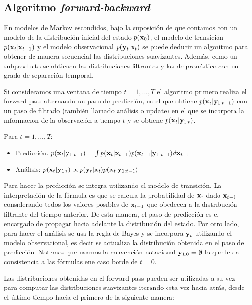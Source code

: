 \subsection{Algoritmo \textit{forward-backward}}

En modelos de Markov escondidos, bajo la suposición de que contamos con un modelo de la distribución inicial del estado $p(\mathbf{x}_0)$, el modelo de transición $p(\mathbf{x}_t | \mathbf{x}_{t-1})$ y el modelo observacional $p(\mathbf{y}_t | \mathbf{x}_t)$ se puede deducir un algoritmo para obtener de manera secuencial las distribuciones suavizantes. Además, como un subproducto se obtienen las distribuciones filtrantes y las de pronóstico con un grado de separación temporal. 

Si consideramos una ventana de tiempo $t = 1, ..., T$ el algoritmo primero realiza el forward-pass alternando un paso de predicción, en el que obtiene $p(\mathbf{x}_t | \mathbf{y}_{1:t-1})$ con un paso de filtrado (también llamado análisis o update) en el que se incorpora la información de la observación a tiempo $t$ y se obtiene $p(\mathbf{x}_t | \mathbf{y}_{1:t})$. 

Para $t = 1, ..., T$:
\begin{itemize}
    \item Predicción: $p(\mathbf{x}_t | \mathbf{y}_{1:t-1}) = \int p(\mathbf{x}_t | \mathbf{x}_{t-1}) p(\mathbf{x}_{t-1} | \mathbf{y}_{1:t-1}) d\mathbf{x}_{t-1}$\label{eq:forward_pred}
    \item Análisis: $p(\mathbf{x}_t | \mathbf{y}_{1:t}) \propto p(\mathbf{y}_t | \mathbf{x}_t) p(\mathbf{x}_t | \mathbf{y}_{1:t-1})$\label{eq:forward_filt}
\end{itemize}
Para hacer la predicción se integra utilizando el modelo de transición. La interpretación de la fórmula es que se calcula la probabilidad de $\mathbf{x}_t$ dado $\mathbf{x}_{t-1}$ considerando todos los valores posibles de $\mathbf{x}_{t-1}$ que obedecen a la distribución filtrante del tiempo anterior. De esta manera, el paso de predicción es el encargado de propagar hacia adelante la distribución del estado. Por otro lado, para hacer el análisis se usa la regla de Bayes y se incorpora $\mathbf{y}_t$ utilizando el modelo observacional, es decir se actualiza la distribución obtenida en el paso de predicción. Notemos que usamos la convención notacional $\mathbf{y}_{1:0} = \emptyset$ lo que le da consistencia a las fórmulas ene caso borde de $t = 0$.

Las distribuciones obtenidas en el forward-pass pueden ser utilizadas a su vez para computar las distribuciones suavizantes iterando esta vez hacia atrás, desde el último tiempo hacia el primero de la siguiente manera:

